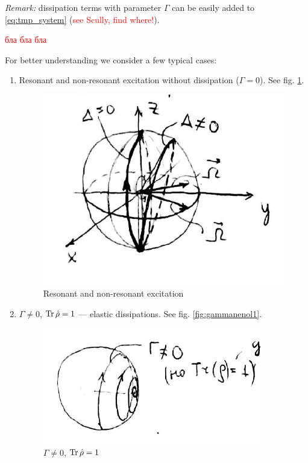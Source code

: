 \textit{Remark:} dissipation terms with parameter $\Gamma$ can be easily added to \eqref{eq:tmp_system} (\textcolor{red}{see Scully, find where!}).

\begin{otherlanguage}{russian}
	\begin{hw}
		\textcolor{red}{бла бла бла}
	\end{hw}
\end{otherlanguage}


For better understanding we consider a few typical cases:
\begin{enumerate}
	\item Resonant and non-resonant excitation without dissipation ($\Gamma = 0$). See fig. \ref{fig:bloch1}.
	\begin{figure}[h!]
		\centering
		\includegraphics[width=0.7\linewidth]{fig/L5/bloch1}
		\caption{Resonant and non-resonant excitation}
		\label{fig:bloch1}
	\end{figure}
	\item $\Gamma \neq 0$, $\operatorname{Tr} \hat{\rho} = 1$ --- elastic dissipations. See fig. \ref{fig:gammanenol1}.
	\begin{figure}[h!]
		\centering
		\includegraphics[width=0.6\linewidth]{fig/L5/gamma_ne_nol_1}
		\caption{$\Gamma \neq 0$, $\operatorname{Tr} \hat{\rho} = 1$}

\end{figure}
\end{enumerate}
